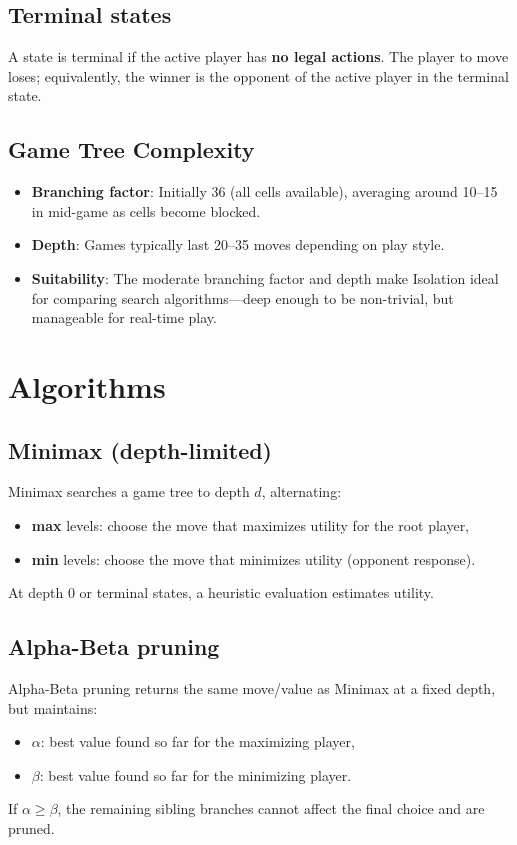 \documentclass[11pt]{article}
\begin{document}
\subsection{Terminal states}
A state is terminal if the active player has \textbf{no legal actions}. The player to move loses; equivalently,
the winner is the opponent of the active player in the terminal state.

\subsection{Game Tree Complexity}
\begin{itemize}
  \item \textbf{Branching factor}: Initially 36 (all cells available), averaging around 10--15 in mid-game as cells become blocked.
  \item \textbf{Depth}: Games typically last 20--35 moves depending on play style.
  \item \textbf{Suitability}: The moderate branching factor and depth make Isolation ideal for comparing search algorithms---deep enough to be non-trivial, but manageable for real-time play.
\end{itemize}

\section{Algorithms}
\subsection{Minimax (depth-limited)}
Minimax searches a game tree to depth \(d\), alternating:
\begin{itemize}
  \item \textbf{max} levels: choose the move that maximizes utility for the root player,
  \item \textbf{min} levels: choose the move that minimizes utility (opponent response).
\end{itemize}
At depth \(0\) or terminal states, a heuristic evaluation estimates utility.

\subsection{Alpha-Beta pruning}
Alpha-Beta pruning returns the same move/value as Minimax at a fixed depth, but maintains:
\begin{itemize}
  \item \(\alpha\): best value found so far for the maximizing player,
  \item \(\beta\): best value found so far for the minimizing player.
\end{itemize}
If \(\alpha \ge \beta\), the remaining sibling branches cannot affect the final choice and are pruned.
\end{document}
